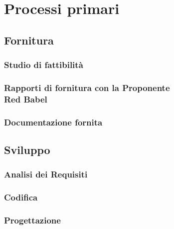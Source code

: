 \documentclass[NormeDiProgetto.tex]{subfiles}
\begin{document}
\chapter{Processi primari}

\section{Fornitura}
\subsection{Studio di fattibilità}
\subsection{Rapporti di fornitura con la Proponente\\ Red Babel}
\subsection{Documentazione fornita}

\section{Sviluppo}
\subsection{Analisi dei Requisiti}
\subsection{Codifica}
\subsection{Progettazione}
\end{document}
